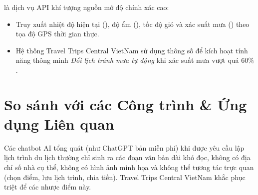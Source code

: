  là dịch vụ API khí tượng nguồn mở độ chính xác cao:
\begin{itemize}
    \item Truy xuất nhiệt độ hiện tại (), độ ẩm (), tốc độ gió và xác suất mưa () theo tọa độ GPS thời gian thực.
    \item Hệ thống Travel Trips Central VietNam sử dụng thông số  để kích hoạt tính năng thông minh \textit{Đổi lịch tránh mưa tự động} khi xác suất mưa vượt quá $60\%$.
\end{itemize}

\section{So sánh với các Công trình \& Ứng dụng Liên quan}

\begin{table}[H]
\centering
\caption{Bảng so sánh tính năng giữa Travel Trips Central VietNam và các nền tảng du lịch hiện hữu}
\label{tab:comparison}
\end{table}

\begin{luuy}
Các chatbot AI tổng quát (như ChatGPT bản miễn phí) khi được yêu cầu lập lịch trình du lịch thường chỉ sinh ra các đoạn văn bản dài khó đọc, không có địa chỉ số nhà cụ thể, không có hình ảnh minh họa và không thể tương tác trực quan (chọn điểm, lưu lịch trình, chia tiền). Travel Trips Central VietNam khắc phục triệt để các nhược điểm này.
\end{luuy}
